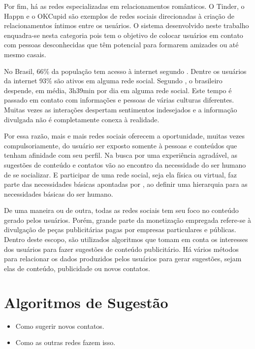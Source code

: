 Por fim, há as redes especializadas em relacionamentos românticos. O Tinder, o Happn e o OKCupid são exemplos de redes sociais direcionadas à criação de relacionamentos íntimos entre os usuários. O sistema desenvolvido neste trabalho enquadra-se nesta categoria pois tem o objetivo de colocar usuários em contato com pessoas desconhecidas que têm potencial para formarem amizades ou até mesmo casais.

No Brasil, 66\% da população tem acesso à internet segundo \cite{wearesocial18}. Dentre os usuários da internet 93\% são ativos em alguma rede social.
Segundo \cite{wearesocial18}, o brasileiro despende, em média, 3h39min por dia em alguma rede social. Este tempo é passado em contato com informações e pessoas de várias culturas diferentes. Muitas vezes as interações despertam sentimentos indesejados e a informação divulgada não é completamente conexa à realidade.

Por essa razão, mais e mais redes sociais oferecem a oportunidade, muitas vezes compulsoriamente, do usuário ser exposto somente à pessoas e conteúdos que tenham afinidade com seu perfil. Na busca por uma experiência agradável, as sugestões de conteúdo e contatos vão ao encontro da necessidade do ser humano de se socializar. E participar de uma rede social, seja ela física ou virtual, faz parte das necessidades básicas apontadas por \cite{Maslow1943}, ao definir uma hierarquia para as necessidades básicas do ser humano.

De uma maneira ou de outra, todas as redes sociais tem seu foco no conteúdo gerado pelos usuários. Porém, grande parte da monetização empregada refere-se à divulgação de peças publicitárias pagas por empresas particulares e públicas. Dentro deste escopo, são utilizados algoritmos que tomam em conta os interesses dos usuários para fazer sugestões de conteúdo publicitário. Há vários métodos para relacionar os dados produzidos pelos usuários para gerar sugestões, sejam elas de conteúdo, publicidade ou novos contatos.


\section{Algoritmos de Sugestão}

\begin{itemize}
\item Como sugerir novos contatos.
\item Como as outras redes fazem isso.

\end{itemize}

